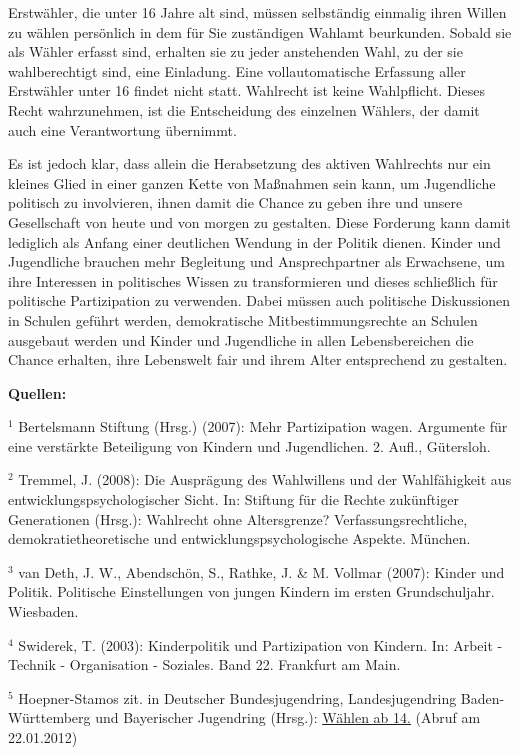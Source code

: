 {Erstwähler, die unter 16 Jahre alt sind, müssen selbständig einmalig ihren Willen zu wählen persönlich in dem für Sie zuständigen Wahlamt beurkunden. Sobald sie als Wähler erfasst sind, erhalten sie zu jeder anstehenden Wahl, zu der sie wahlberechtigt sind, eine Einladung. Eine vollautomatische Erfassung aller Erstwähler unter 16 findet nicht statt. Wahlrecht ist keine Wahlpflicht. Dieses Recht wahrzunehmen, ist die Entscheidung des einzelnen Wählers, der damit auch eine Verantwortung übernimmt.

Es ist jedoch klar, dass allein die Herabsetzung des aktiven Wahlrechts nur ein kleines Glied in einer ganzen Kette von Maßnahmen sein kann, um Jugendliche politisch zu involvieren, ihnen damit die Chance zu geben ihre und unsere Gesellschaft von heute und von morgen zu gestalten. Diese Forderung kann damit lediglich als Anfang einer deutlichen Wendung in der Politik dienen. Kinder und Jugendliche brauchen mehr Begleitung und Ansprechpartner als Erwachsene, um ihre Interessen in politisches Wissen zu transformieren und dieses schließlich für politische Partizipation zu verwenden. Dabei müssen auch politische Diskussionen in Schulen geführt werden, demokratische Mitbestimmungsrechte an Schulen ausgebaut werden und Kinder und Jugendliche in allen Lebensbereichen die Chance erhalten, ihre Lebenswelt fair und ihrem Alter entsprechend zu gestalten.

\textbf{Quellen:}

$^1$ Bertelsmann Stiftung (Hrsg.) (2007): Mehr Partizipation wagen. Argumente für eine verstärkte Beteiligung von Kindern und Jugendlichen. 2. Aufl., Gütersloh.

$^2$ Tremmel, J. (2008): Die Ausprägung des Wahlwillens und der Wahlfähigkeit aus entwicklungspsychologischer Sicht. In: Stiftung für die Rechte zukünftiger Generationen (Hrsg.): Wahlrecht ohne Altersgrenze? Verfassungsrechtliche, demokratietheoretische und entwicklungspsychologische Aspekte. München.

$^3$ van Deth, J. W., Abendschön, S., Rathke, J. \& M. Vollmar (2007): Kinder und Politik. Politische Einstellungen von jungen Kindern im ersten Grundschuljahr. Wiesbaden.

$^4$ Swiderek, T. (2003): Kinderpolitik und Partizipation von Kindern. In: Arbeit - Technik - Organisation - Soziales. Band 22. Frankfurt am Main.

$^5$ Hoepner-Stamos zit. in Deutscher Bundesjugendring, Landesjugendring Baden-Württemberg und Bayerischer Jugendring (Hrsg.): \href{http://www.waehlen-ab-14.de/wahlalter-14/argumentationshilfen.php}{Wählen ab 14.} (Abruf am 22.01.2012)

}
